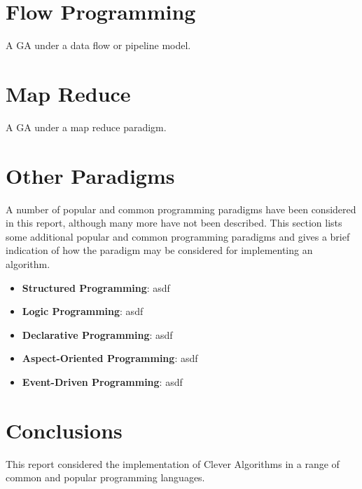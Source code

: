 \documentclass[a4paper, 11pt]{article}
\begin{document}
\section{Flow Programming}
A GA under a data flow or pipeline model.

\section{Map Reduce}
A GA under a map reduce paradigm.

\section{Other Paradigms}
A number of popular and common programming paradigms have been considered in this report, although many more have not been described. This section lists some additional popular and common programming paradigms and gives a brief indication of how the paradigm may be considered for implementing an algorithm.

\begin{itemize}
	\item \textbf{Structured Programming}: asdf
	\item \textbf{Logic Programming}: asdf
	\item \textbf{Declarative Programming}: asdf
	\item \textbf{Aspect-Oriented Programming}: asdf
	\item \textbf{Event-Driven Programming}: asdf
\end{itemize}

\section{Conclusions}
\label{sec:conclusions}
This report considered the implementation of Clever Algorithms in a range of common and popular programming languages. 




\end{document}
